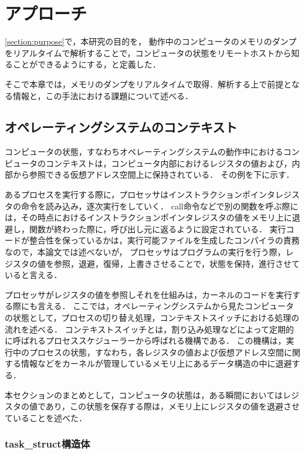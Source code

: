 \chapter{アプローチ}
\label{chap:approach}

\ref{section:purpose}で，本研究の目的を，
動作中のコンピュータのメモリのダンプをリアルタイムで解析することで，コンピュータの状態をリモートホストから知ることができるようにする，と定義した．

そこで本章では，メモリのダンプをリアルタイムで取得．解析する上で前提となる情報と，この手法における課題について述べる．

\section{オペレーティングシステムのコンテキスト}
\label{section:context}

コンピュータの状態，すなわちオペレーティングシステムの動作中におけるコンピュータのコンテキストは，コンピュータ内部におけるレジスタの値および，内部から参照できる仮想アドレス空間上に保持されている．
その例を下に示す．

あるプロセスを実行する際に，プロセッサはインストラクションポインタレジスタの命令を読み込み，逐次実行をしていく．
call命令などで別の関数を呼ぶ際には，その時点におけるインストラクションポインタレジスタの値をメモリ上に退避し，関数が終わった際に，呼び出し元に返るように設定されている．
実行コードが整合性を保っているかは，実行可能ファイルを生成したコンパイラの責務なので，本論文では述べないが，
プロセッサはプログラムの実行を行う際，レジスタの値を参照，退避，復帰，上書きさせることで，状態を保持，進行させていると言える．

プロセッサがレジスタの値を参照しそれを仕組みは，カーネルのコードを実行する際にも言える．
ここでは，オペレーティングシステムから見たコンピュータの状態として，プロセスの切り替え処理，コンテキストスイッチにおける処理の流れを述べる．
コンテキストスイッチとは，割り込み処理などによって定期的に呼ばれるプロセススケジューラーから呼ばれる機構である．
この機構は，実行中のプロセスの状態，すなわち，各レジスタの値および仮想アドレス空間に関する情報などをカーネルが管理しているメモリ上にあるデータ構造の中に退避する．

本セクションのまとめとして，コンピュータの状態は，ある瞬間においてはレジスタの値であり，この状態を保存する際は，メモリ上にレジスタの値を退避させていることを述べた．

\subsection{task\_struct構造体}

